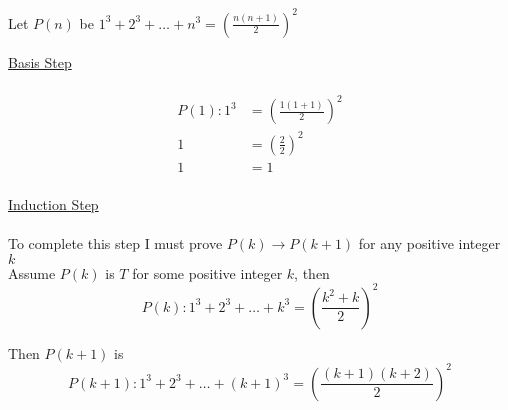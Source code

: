 \documentclass[12pt letter]{report}
\begin{document}
\begin{myproof}

  Let $P \left( n \right) $ be $1^3 + 2^3 + \ldots + n^3 = \left( \frac{n \left( n + 1 \right) }{2} \right)^2$

  \noindent \underline{Basis Step} \\
  \\
  \begin{align*}
    P \left( 1 \right): 1^3 & = \left( \frac{1 \left( 1 + 1 \right) }{2} \right)^2 \\
    1                       & = \left( \frac{2}{2} \right)^2                       \\
    1                       & = 1                                                  \\
  \end{align*}

  \noindent \underline{Induction  Step} \\
  \\

  \noindent To complete this step I must prove $P \left( k \right) \to P \left( k + 1 \right)  $ for any positive integer $k$ \\
  Assume $P \left( k \right) $ is $T$  for some positive integer $k$, then \\
  \[
    P \left( k \right): 1^3 + 2^3 + \ldots + k^3 = \left( \frac{k^2 + k}{2} \right)^2
  \]

  Then $P \left( k + 1 \right) $ is
  \[
    P \left( k + 1 \right) : 1^3 + 2^3 + \ldots + \left( k + 1 \right) ^3 = \left( \frac{\left( k + 1 \right) \left( k + 2
        \right) }{2} \right)^2
  \]


\end{myproof}
\end{document}
